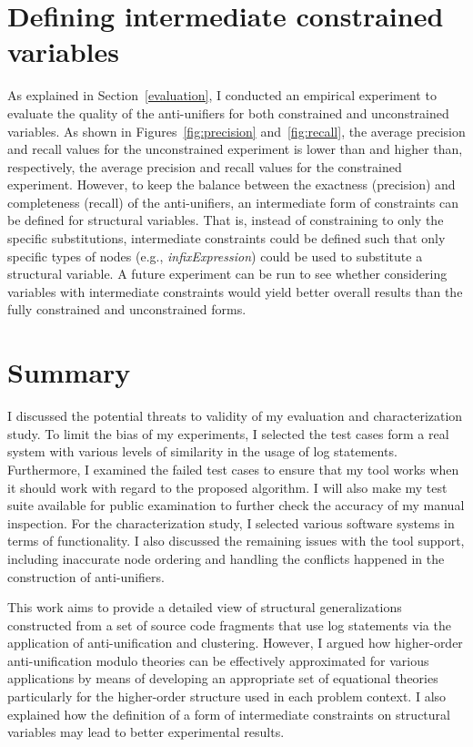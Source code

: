 \section{Defining intermediate constrained variables}  \label{intC}
As explained in Section~\ref{evaluation}, I conducted an empirical experiment to evaluate the quality of the anti-unifiers for both constrained and unconstrained variables. As shown in Figures~\ref{fig:precision} and~\ref{fig:recall}, the average precision and recall values for the unconstrained experiment is lower than and higher than, respectively, the average precision and recall values for the constrained experiment. However, to keep the balance between the exactness (precision) and completeness (recall) of the anti-unifiers, an intermediate form of constraints can be defined for structural variables. That is, instead of constraining to only the specific substitutions, intermediate constraints could be defined such that only specific types of nodes (e.g., \textit{infixExpression}) could be used to substitute a structural variable. A future experiment can be run to see whether considering variables with intermediate constraints would yield better overall results than the fully constrained and unconstrained forms.


\section{Summary}  \label{diss-summary}
I discussed the potential threats to validity of my evaluation and characterization study. To limit the bias of my experiments, I selected the test cases form a real system with various levels of similarity in the usage of log statements. Furthermore, I examined the failed test cases to ensure that my tool works when it should work with regard to the proposed algorithm. I will also make my test suite available for public examination to further check the accuracy of my manual inspection. For the characterization study, I selected various software systems in terms of functionality. I also discussed the remaining issues with the tool support, including inaccurate node ordering and handling the conflicts happened in the construction of anti-unifiers.

This work aims to provide a detailed view of structural generalizations constructed from a set of source code fragments that use log statements via the application of anti-unification and clustering. However, I argued how higher-order anti-unification modulo theories can be effectively approximated for various applications by means of developing an appropriate set of equational theories particularly for the higher-order structure used in each problem context. I also explained how the definition of a form of intermediate constraints on structural variables may lead to better experimental results.

